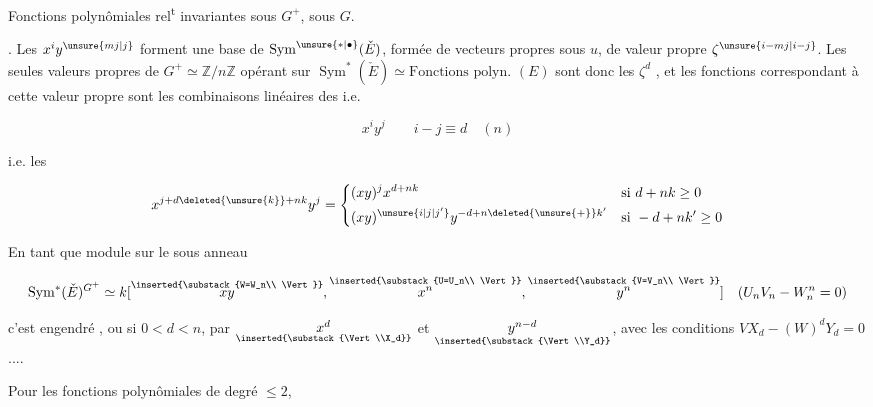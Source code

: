 
Fonctions polynômiales rel\textsuperscript{t} invariantes sous $G^+$, sous $G$.

. Les $x^{i}y^{\unsure{mj|j}}$ forment une base de $\operatorname{Sym}^{\unsure{*|\bullet}}(\check E)$, formée de vecteurs propres sous $u$, de valeur propre $\zeta^{\unsure{i-mj|i-j}}$.  Les seules valeurs propres de $G^+\simeq\mathbb Z/n\mathbb Z$ opérant sur $\operatorname{Sym}^*(\check E)\simeq\text{Fonctions polyn. }(E)$ sont donc les $\zeta^d$ , et les fonctions correspondant à cette valeur propre sont les combinaisons linéaires des  i.e.

\[x^iy^j\qquad i-j\equiv d\quad(n)\]

i.e. les

\[
x^{j+d\deleted{\unsure{k}}+nk}y^j=
\left\{\begin{aligned}
&(xy)^j x^{d+nk}&&\text{si }d+nk\geq0\\
&(xy)^{\unsure{i|j|j'}}y^{-d+n\deleted{\unsure{+}}k'}&&\text{si }-d+nk'\geq0
\end{aligned}\right.
\]

 En tant que module sur le sous anneau

\[\operatorname{Sym}^*(\check E)^{G^+}\simeq k[
\overset{\inserted{\substack{W=W_n\\ \Vert}}}{xy},
\overset{\inserted{\substack{U=U_n\\ \Vert}}}{x^n},
\overset{\inserted{\substack{V=V_n\\ \Vert}}}{y^n}]
\quad(U_{n}V_n-W_n^n=0)\]

c'est engendré  , ou si $0<d<n$, par $\underset{\inserted{\substack{\Vert\\X_d}}}{x^d}$ et $\underset{\inserted{\substack{\Vert\\Y_d}}}{y^{n-d}}$, avec les conditions $VX_d-(W)^dY_d=0$ ....

Pour les fonctions polynômiales de degré $\leq2$,

